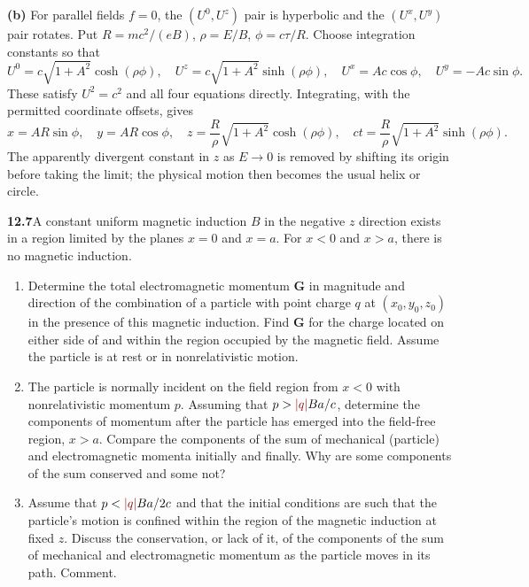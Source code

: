 \medskip\noindent\textbf{(b)} For parallel fields $f=0$, the $(U^0,U^z)$ pair is hyperbolic and
the $(U^x,U^y)$ pair rotates.  Put
$R=mc^2/(eB)$, $\rho=E/B$, $\phi=c\tau/R$.
Choose integration constants so that
\[
U^0=c\sqrt{1+A^2}\cosh(\rho\phi),\quad
U^z=c\sqrt{1+A^2}\sinh(\rho\phi),\quad
U^x=Ac\cos\phi,\quad U^y=-Ac\sin\phi.
\]
These satisfy $U^2=c^2$ and all four equations directly.
Integrating, with the permitted coordinate offsets, gives
\[
\boxed{x=AR\sin\phi,\quad y=AR\cos\phi,\quad
z=\frac R\rho\sqrt{1+A^2}\cosh(\rho\phi),\quad
ct=\frac R\rho\sqrt{1+A^2}\sinh(\rho\phi).}
\]
The apparently divergent constant in $z$ as $E\to0$ is removed
by shifting its origin before taking the limit; the physical motion
then becomes the usual helix or circle.

\par\bigskip
\noindent\textbf{12.7}\quad A constant uniform magnetic induction $B$ in the negative $z$ direction exists in a region limited by the planes $x=0$ and $x=a$. For $x<0$ and $x>a$, there is no magnetic induction.
\begin{enumerate}
\item[(a)] Determine the total electromagnetic momentum $\mathbf{G}$ in magnitude and direction of the combination of a particle with point charge $q$ at $(x_{0},y_{0},z_{0})$ in the presence of this magnetic induction. Find $\mathbf{G}$ for the charge located on either side of and within the region occupied by the magnetic field. Assume the particle is at rest or in nonrelativistic motion. 
\item[(b)] The particle is normally incident on the field region from $x<0$ with nonrelativistic momentum $p$. Assuming that $p>\erratum{|q|}Ba/c$, determine the components of momentum after the particle has emerged into the field-free region, $x>a$. Compare the components of the sum of mechanical (particle) and electromagnetic momenta initially and finally. Why are some components of the sum conserved and some not?
\item[(c)] Assume that $p<\erratum{|q|}Ba/2c$ and that the initial conditions are such that the particle's motion is confined within the region of the magnetic induction at fixed $z$. Discuss the conservation, or lack of it, of the components of the sum of mechanical and electromagnetic momentum as the particle moves in its path. Comment.
\end{enumerate}
\solution

